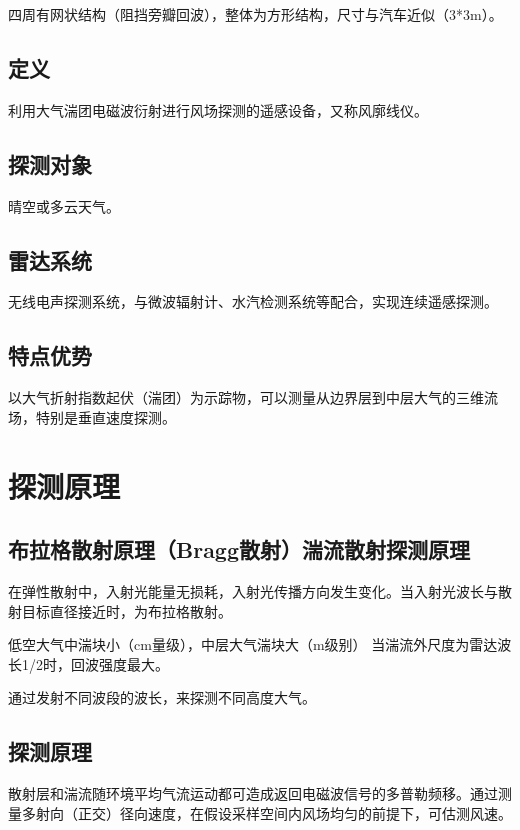 \documentclass[UTF8,11pt]{ctexbook}
\begin{document}
四周有网状结构（阻挡旁瓣回波），整体为方形结构，尺寸与汽车近似（3*3m）。

\subsection{定义}

利用大气湍团电磁波衍射进行风场探测的遥感设备，又称风廓线仪。

\subsection{探测对象 }

晴空或多云天气。

\subsection{雷达系统}

无线电声探测系统，与微波辐射计、水汽检测系统等配合，实现连续遥感探测。

\subsection{特点优势}

以大气折射指数起伏（湍团）为示踪物，可以测量从边界层到中层大气的三维流场，特别是垂直速度探测。

\section{探测原理}

\subsection{布拉格散射原理（Bragg散射）湍流散射探测原理}

在弹性散射中，入射光能量无损耗，入射光传播方向发生变化。当入射光波长与散射目标直径接近时，为布拉格散射。

低空大气中湍块小（cm量级），中层大气湍块大（m级别）  当湍流外尺度为雷达波长1/2时，回波强度最大。

通过发射不同波段的波长，来探测不同高度大气。

\subsection{探测原理}

散射层和湍流随环境平均气流运动都可造成返回电磁波信号的多普勒频移。通过测量多射向（正交）径向速度，在假设采样空间内风场均匀的前提下，可估测风速。
\end{document}
